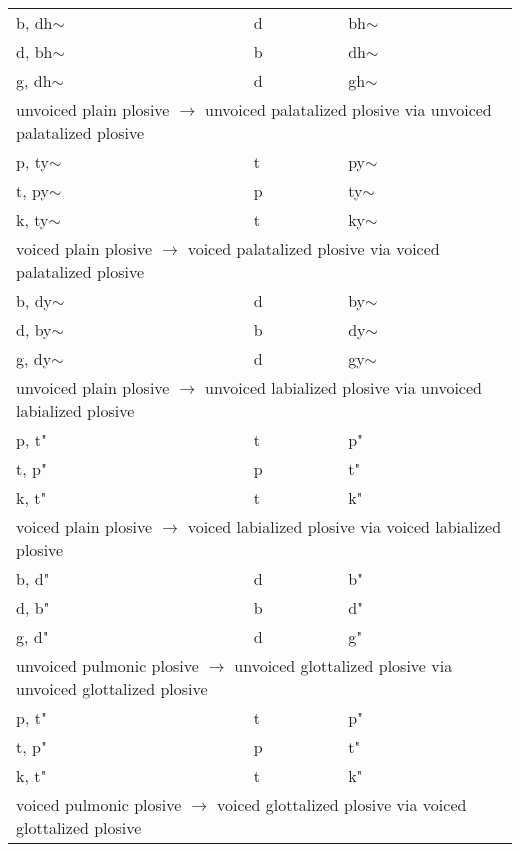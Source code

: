 \documentclass[6pt]{article}
\begin{document}
\begin{longtable}{ l | l | l }
b, dh$\sim$ & d & bh$\sim$ \\
d, bh$\sim$ & b & dh$\sim$ \\
g, dh$\sim$ & d & gh$\sim$ \\

\hline \multicolumn{3}{l}{unvoiced plain plosive  $\rightarrow$ unvoiced palatalized plosive via unvoiced palatalized plosive  }\\  \hline

p, ty$\sim$ & t & py$\sim$ \\
t, py$\sim$ & p & ty$\sim$ \\
k, ty$\sim$ & t & ky$\sim$ \\


\hline \multicolumn{3}{l}{voiced plain plosive  $\rightarrow$ voiced palatalized plosive via voiced palatalized plosive }\\  \hline

b, dy$\sim$ & d & by$\sim$ \\
d, by$\sim$ & b & dy$\sim$ \\
g, dy$\sim$ & d & gy$\sim$ \\

\hline \multicolumn{3}{l}{unvoiced plain plosive  $\rightarrow$ unvoiced labialized plosive via unvoiced labialized plosive }\\  \hline

p, t" & t & p" \\
t, p" & p & t" \\
k, t" & t & k" \\

\hline \multicolumn{3}{l}{voiced plain plosive  $\rightarrow$ voiced labialized plosive via voiced labialized plosive      }\\  \hline

b, d" & d & b" \\
d, b" & b & d" \\
g, d" & d & g" \\

\hline \multicolumn{3}{l}{unvoiced pulmonic plosive  $\rightarrow$ unvoiced glottalized plosive via unvoiced glottalized plosive  }\\  \hline

p, t" & t & p" \\
t, p" & p & t" \\
k, t" & t & k" \\

\hline \multicolumn{3}{l}{voiced pulmonic plosive  $\rightarrow$ voiced glottalized plosive via voiced glottalized plosive}\\  \hline


\end{longtable}
\end{document}

